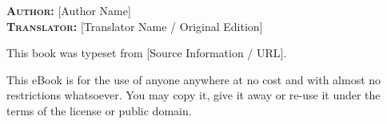 \pagebreak
\thispagestyle{empty}
\begin{flushleft}
\small
\textsc{\textbf{Author:}} [Author Name]\\
\textsc{\textbf{Translator:}} [Translator Name / Original Edition]\\
\end{flushleft}
{\small
\vspace{0.2in}
\noindent
This book was typeset from [Source Information / URL].
\vfill
\begin{displayquote}
This eBook is for the use of anyone anywhere at no cost and with almost no
restrictions whatsoever. You may copy it, give it away or re-use it under the
terms of the license or public domain.
\end{displayquote}
\vspace{0.2in}
}
\thispagestyle{empty}
